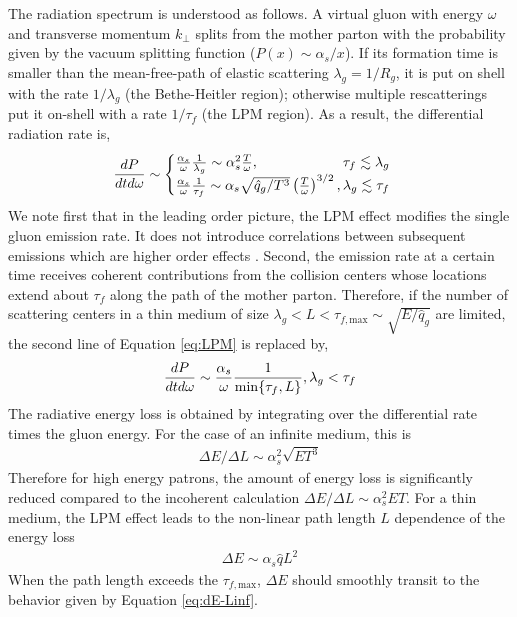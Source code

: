 \documentclass[aps, prc, reprint, amsmath, groupedaddress, nofootinbib]{revtex4-1}
\begin{document}
The radiation spectrum is understood as follows. 
A virtual gluon with energy $\omega$ and transverse momentum $k_\perp$ splits from the mother parton with the probability given by the vacuum splitting function ($P(x) \sim \alpha_s/x$).
If its formation time is smaller than the mean-free-path of elastic scattering $\lambda_g = 1/R_g$, it is put on shell with the rate $1/\lambda_g$ (the Bethe-Heitler region); otherwise multiple rescatterings put it on-shell with a rate $1/\tau_f$ (the LPM region).
As a result, the differential radiation rate is,
\begin{eqnarray}\label{eq:LPM}
\frac{dP}{dt d\omega} \sim \begin{cases}
 \frac{\alpha_s}{\omega} \frac{1}{\lambda_g} \sim \alpha_s^2  \frac{T}{\omega}, \hfill \tau_f \lesssim \lambda_g\\
 \frac{\alpha_s}{\omega} \frac{1}{\tau_f}\sim \alpha_s \sqrt{\hat{q}_g/T^3} \left(\frac{T}{\omega}\right)^{3/2}, \hfill \lambda_g \lesssim \tau_f
\end{cases}
\end{eqnarray}
We note first that in the leading order picture, the LPM effect modifies the single gluon emission rate. 
It does not introduce correlations between subsequent emissions which are higher order effects \cite{Arnold:2016jnq}.
Second, the emission rate at a certain time receives coherent contributions from the collision centers whose locations extend about $\tau_f$ along the path of the mother parton.
Therefore, if the number of scattering centers in a thin medium of size $\lambda_g < L< \tau_{f,\textrm{max}} \sim \sqrt{E/\hat{q}_g}$ are limited, the second line of Equation \ref{eq:LPM} is replaced by,
\begin{eqnarray}
\frac{dP}{dt d\omega} \sim 
 \frac{\alpha_s}{\omega} \frac{1}{\min\{\tau_f,L\}}, \hfill \lambda_g < \tau_f
\end{eqnarray}
The radiative energy loss is obtained by integrating over the differential rate times the gluon energy. 
For the case of an infinite medium, this is
\begin{eqnarray}\label{eq:dE-Linf}
\Delta E/\Delta L \sim \alpha_s^2 \sqrt{ET^3}
\end{eqnarray}
Therefore for high energy patrons, the amount of energy loss is significantly reduced compared to the incoherent calculation $\Delta E/\Delta L \sim \alpha_s^2 E T$.
For a thin medium, the LPM effect leads to the non-linear path length $L$ dependence of the energy loss
\begin{eqnarray}\label{eq:dE-Lfinite}
\Delta E \sim \alpha_s \hat{q} L^2
\end{eqnarray}
When the path length exceeds the $\tau_{f,\textrm{max}}$, $\Delta E$ should smoothly transit to the behavior given by Equation \ref{eq:dE-Linf}.
\end{document}
